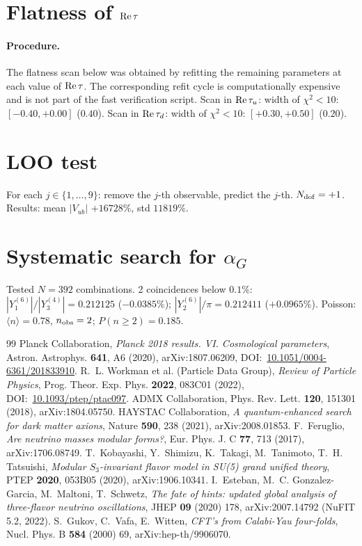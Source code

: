 \documentclass[12pt,a4paper]{article}
\numberwithin{equation}{section}
\begin{document}
\section{Flatness of \({\rm Re}\,\tau\)}
\paragraph{Procedure.}
The flatness scan below was obtained by refitting the remaining parameters at each value of \({\rm Re}\,\tau\). The corresponding refit cycle is computationally expensive and is not part of the fast verification script.
Scan in \({\rm Re}\,\tau_u\): width of \(\chi^2<10\): \([-0.40, +0.00]\) (\(0.40\)). Scan in \({\rm Re}\,\tau_d\): width of \(\chi^2<10\): \([+0.30, +0.50]\) (\(0.20\)).

\section{LOO test}
For each \(j\in\{1,\ldots,9\}\): remove the \(j\)-th observable, predict the \(j\)-th. \(N_{\rm dof} = +1\). Results: mean \(|V_{ub}|\) \(+16728\%\), std \(11819\%\).

\section{Systematic search for \(\alpha_G\)}
Tested \(N = 392\) combinations. 2 coincidences below \(0.1\%\): \(|Y_1^{(6)}|/|Y_3^{(4)}| = 0.212125\) (\(-0.0385\%\)); \(|Y_2^{(6)}|/\pi = 0.212411\) (\(+0.0965\%\)). Poisson: \(\langle n\rangle = 0.78\), \(n_{\rm obs} = 2\); \(P(n\ge 2) = 0.185\).

\begin{thebibliography}{99}
 Planck Collaboration, \emph{Planck 2018 results. VI. Cosmological parameters}, Astron. Astrophys. \textbf{641}, A6 (2020), arXiv:1807.06209, DOI:~\href{https://doi.org/10.1051/0004-6361/201833910}{10.1051/0004-6361/201833910}.
 R.~L. Workman et al. (Particle Data Group), \emph{Review of Particle Physics}, Prog. Theor. Exp. Phys. \textbf{2022}, 083C01 (2022), DOI:~\href{https://doi.org/10.1093/ptep/ptac097}{10.1093/ptep/ptac097}.
 ADMX Collaboration, Phys. Rev. Lett. \textbf{120}, 151301 (2018), arXiv:1804.05750.
 HAYSTAC Collaboration, \emph{A quantum-enhanced search for dark matter axions}, Nature \textbf{590}, 238 (2021), arXiv:2008.01853.
 F.~Feruglio, \emph{Are neutrino masses modular forms?}, Eur. Phys. J. C \textbf{77}, 713 (2017), arXiv:1706.08749.
 T.~Kobayashi, Y.~Shimizu, K.~Takagi, M.~Tanimoto, T.~H. Tatsuishi, \emph{Modular \(S_3\)-invariant flavor model in SU(5) grand unified theory}, PTEP \textbf{2020}, 053B05 (2020), arXiv:1906.10341.
 I.~Esteban, M.~C. Gonzalez-Garcia, M.~Maltoni, T.~Schwetz, \emph{The fate of hints: updated global analysis of three-flavor neutrino oscillations}, JHEP \textbf{09} (2020) 178, arXiv:2007.14792 (NuFIT 5.2, 2022).
 S.~Gukov, C.~Vafa, E.~Witten, \emph{CFT's from Calabi-Yau four-folds}, Nucl. Phys. B \textbf{584} (2000) 69, arXiv:hep-th/9906070.
\end{thebibliography}
\end{document}
